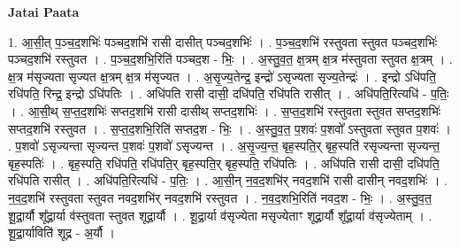\documentclass[17pt]{extarticle}
\begin{document}
\textbf{Jatai Paata} \newline

1. आ॒सी॒त् प॒ञ्च॒द॒शभिः॑ पञ्चद॒शभि॑ रासी दासीत् पञ्चद॒शभिः॑ । . प॒ञ्च॒द॒शभि॑ रस्तुवता स्तुवत पञ्चद॒शभिः॑ पञ्चद॒शभि॑ रस्तुवत । . प॒ञ्च॒द॒शभि॒रिति॑ पञ्चद॒श - भिः॒ । . अ॒स्तु॒व॒त॒ क्ष॒त्रम् क्ष॒त्र म॑स्तुवता स्तुवत क्ष॒त्रम् । . क्ष॒त्र म॑सृज्यता सृज्यत क्ष॒त्रम् क्ष॒त्र म॑सृज्यत । . अ॒सृ॒ज्य॒तेन्द्र॒ इन्द्रो॑ ऽसृज्यता सृज्य॒तेन्द्रः॑ । . इन्द्रो ऽधि॑पति॒ रधि॑पति॒ रिन्द्र॒ इन्द्रो ऽधि॑पतिः । . अधि॑पति रासी दासी॒ दधि॑पति॒ रधि॑पति रासीत् । . अधि॑पति॒रित्यधि॑ - प॒तिः॒ । . आ॒सी॒थ् स॒प्त॒द॒शभिः॑ सप्तद॒शभि॑ रासी दासीथ् सप्तद॒शभिः॑ । . स॒प्त॒द॒शभि॑ रस्तुवता स्तुवत सप्तद॒शभिः॑ सप्तद॒शभि॑ रस्तुवत । . स॒प्त॒द॒शभि॒रिति॑ सप्तद॒श - भिः॒ । . अ॒स्तु॒व॒त॒ प॒शवः॑ प॒शवो᳚ ऽस्तुवता स्तुवत प॒शवः॑ । . प॒शवो॑ ऽसृज्यन्ता सृज्यन्त प॒शवः॑ प॒शवो॑ ऽसृज्यन्त । . अ॒सृ॒ज्य॒न्त॒ बृह॒स्पति॒र् बृह॒स्पति॑ रसृज्यन्ता सृज्यन्त॒ बृह॒स्पतिः॑ । . बृह॒स्पति॒ रधि॑पति॒ रधि॑पति॒र् बृह॒स्पति॒र् बृह॒स्पति॒ रधि॑पतिः । . अधि॑पति रासी दासी॒ दधि॑पति॒ रधि॑पति रासीत् । . अधि॑पति॒रित्यधि॑ - प॒तिः॒ । . आ॒सी॒न् न॒व॒द॒शभि॑र् नवद॒शभि॑ रासी दासीन् नवद॒शभिः॑ । . न॒व॒द॒शभि॑ रस्तुवता स्तुवत नवद॒शभि॑र् नवद॒शभि॑ रस्तुवत । . न॒व॒द॒शभि॒रिति॑ नवद॒श - भिः॒ । . अ॒स्तु॒व॒त॒ शू॒द्रा॒र्यौ शू᳚द्रा॒र्या व॑स्तुवता स्तुवत शूद्रा॒र्यौ । . शू॒द्रा॒र्या व॑सृज्येता मसृज्येताꣳ शूद्रा॒र्यौ शू᳚द्रा॒र्या व॑सृज्येताम् । . शू॒द्रा॒र्याविति॑ शूद्र - अ॒र्यौ । \newline
\end{document}
